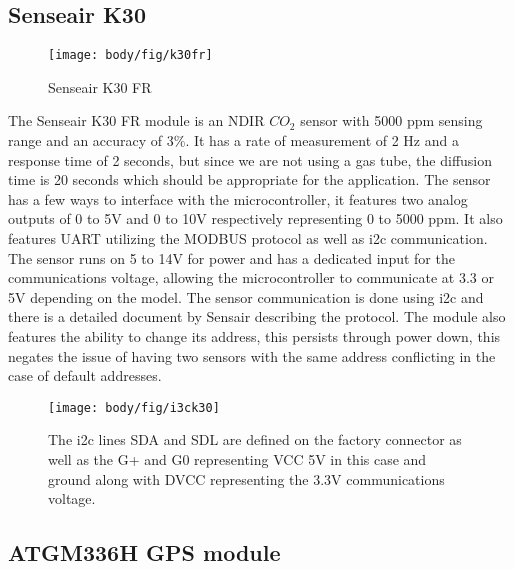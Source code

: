 \subsection{Senseair K30}
\begin{figure}[!htb]
	\centering
	\texttt{[image: body/fig/k30fr]}
	\caption{Senseair K30 FR}
	\label{fig:k30fr}
\end{figure}
The Senseair K30 FR module is an NDIR $ CO_2 $ sensor with 5000 ppm sensing range and an accuracy of 3\%. It has a rate of measurement of 2 Hz and a response time of 2 seconds, but since we are not using a gas tube, the diffusion time is 20 seconds which should be appropriate for the application. The sensor has a few ways to interface with the microcontroller, it features two analog outputs of 0 to 5V and 0 to 10V respectively representing 0 to 5000 ppm. It also features UART utilizing the MODBUS protocol as well as i2c communication. The sensor runs on 5 to 14V for power and has a dedicated input for the communications voltage, allowing the microcontroller to communicate at 3.3 or 5V depending on the model. The sensor communication is done using i2c and there is a detailed document by Sensair describing the protocol. The module also features the ability to change its address, this persists through power down, this negates the issue of having two sensors with the same address conflicting in the case of default addresses. 
\begin{figure}[!htb]
	\centering
	\texttt{[image: body/fig/i3ck30]}
	\caption[i2c for K30]{The i2c lines SDA and SDL are defined on the factory connector as well as the G+ and G0 representing VCC 5V in this case and ground along with DVCC representing the 3.3V communications voltage.}
	\label{fig:i3ck30}
\end{figure}
\pagebreak
\subsection{ATGM336H GPS module}

